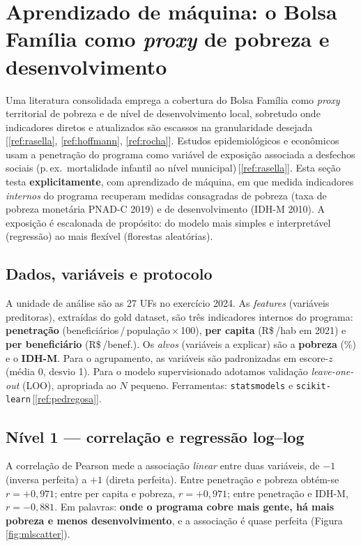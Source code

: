 \documentclass[12pt,a4paper,oneside]{article}
\newcommand{\rs}{R\$\,}
\begin{document}
\section{Aprendizado de máquina: o Bolsa Família como \textit{proxy} de pobreza e desenvolvimento}\label{sec:ml}

Uma literatura consolidada emprega a cobertura do Bolsa Família como
\textit{proxy} territorial de pobreza e de nível de desenvolvimento
local, sobretudo onde indicadores diretos e atualizados são escassos na
granularidade desejada\,[\ref{ref:rasella}, \ref{ref:hoffmann},
\ref{ref:rocha}]. Estudos epidemiológicos e econômicos usam a penetração
do programa como variável de exposição associada a desfechos sociais
(p.\,ex.\ mortalidade infantil ao nível municipal)\,[\ref{ref:rasella}].
Esta seção testa \textbf{explicitamente}, com aprendizado de máquina, em
que medida indicadores \textit{internos} do programa recuperam medidas
consagradas de pobreza (taxa de pobreza monetária PNAD-C 2019) e de
desenvolvimento (IDH-M 2010). A exposição é escalonada de propósito: do
modelo mais simples e interpretável (regressão) ao mais flexível
(florestas aleatórias).

\subsection{Dados, variáveis e protocolo}

A unidade de análise são as 27 UFs no exercício 2024. As
\textit{features} (variáveis preditoras), extraídas do gold dataset, são
três indicadores internos do programa: \textbf{penetração}
(beneficiários\,/\,população\,$\times$\,100), \textbf{per capita}
(\rs/hab em 2021) e \textbf{per beneficiário} (\rs/benef.). Os
\textit{alvos} (variáveis a explicar) são a \textbf{pobreza} (\%) e o
\textbf{IDH-M}. Para o agrupamento, as variáveis são padronizadas em
escore-$z$ (média 0, desvio 1). Para o modelo supervisionado adotamos
validação \textit{leave-one-out} (LOO), apropriada ao $N$ pequeno.
Ferramentas: \texttt{statsmodels} e \texttt{scikit-learn}\,[\ref{ref:pedregosa}].

\subsection{Nível 1 --- correlação e regressão log--log}

A correlação de Pearson mede a associação \textit{linear} entre duas
variáveis, de $-1$ (inversa perfeita) a $+1$ (direta perfeita). Entre
penetração e pobreza obtém-se $r = +0{,}971$; entre per capita e
pobreza, $r = +0{,}971$; entre penetração e IDH-M, $r = -0{,}881$. Em
palavras: \textbf{onde o programa cobre mais gente, há mais pobreza e
menos desenvolvimento}, e a associação é quase perfeita
(Figura \ref{fig:mlscatter}).
\end{document}
